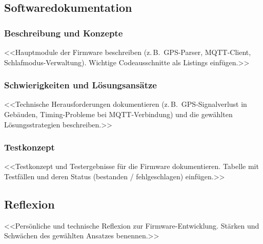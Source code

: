 \subsection{Softwaredokumentation}

\subsubsection{Beschreibung und Konzepte}
<<Hauptmodule der Firmware beschreiben (z.\,B.\ GPS-Parser, MQTT-Client,
Schlafmodus-Verwaltung). Wichtige Codeausschnitte als Listings einfügen.>>


\subsubsection{Schwierigkeiten und Lösungsansätze}
<<Technische Herausforderungen dokumentieren (z.\,B.\ GPS-Signalverlust in
Gebäuden, Timing-Probleme bei MQTT-Verbindung) und die gewählten
Lösungsstrategien beschreiben.>>

\subsubsection{Testkonzept}
<<Testkonzept und Testergebnisse für die Firmware dokumentieren.
Tabelle mit Testfällen und deren Status (bestanden / fehlgeschlagen) einfügen.>>

\subsection{Reflexion}
<<Persönliche und technische Reflexion zur Firmware-Entwicklung.
Stärken und Schwächen des gewählten Ansatzes benennen.>>
